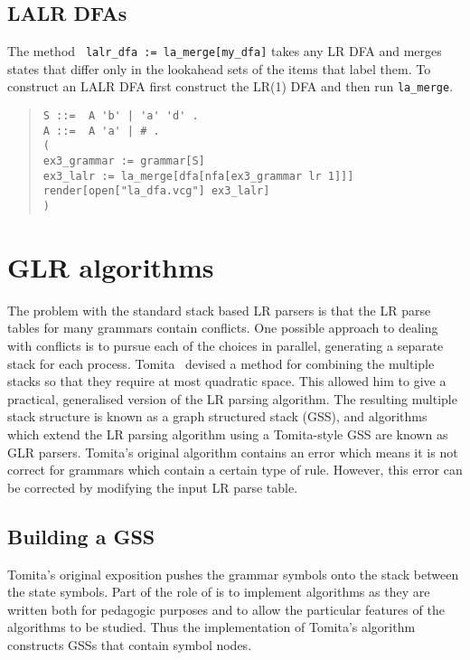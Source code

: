 \subsection{LALR DFAs}

The \gtb method
\verb+ lalr_dfa := la_merge[my_dfa]+
takes any LR DFA and merges states that differ only in the lookahead
sets of the items that label them. To construct an LALR DFA first
construct the LR(1) DFA and then run \verb+la_merge+.
\begin{quote}
\begin{verbatim}
S ::=  A 'b' | 'a' 'd' .
A ::=  A 'a' | # .
(
ex3_grammar := grammar[S]
ex3_lalr := la_merge[dfa[nfa[ex3_grammar lr 1]]]
render[open["la_dfa.vcg"] ex3_lalr]
)
\end{verbatim}
\end{quote}


\section{GLR algorithms}\label{GLR}

The problem with the standard stack based LR parsers
is that the LR parse tables for many grammars
contain conflicts. One possible 
approach to dealing with conflicts is to
pursue each of the choices in parallel, generating a separate stack
for each process. 
Tomita~\cite{TOMITA91} devised a method for combining the multiple
stacks so that they require at most quadratic space. This
allowed him to give a practical, generalised version of the LR parsing
algorithm.
The resulting multiple stack structure is known as a graph structured
stack (GSS), and algorithms which extend the LR parsing algorithm
using a Tomita-style GSS are known as GLR parsers.
Tomita's original algorithm contains an error which means it is not
correct for grammars which contain a certain type of rule. However,
this error can be corrected by modifying the input LR parse table.


\subsection{Building a GSS}


Tomita's original exposition pushes the grammar symbols onto
the stack between the state symbols. Part of the role of \gtb is to implement
algorithms as they are written both for pedagogic purposes and to
allow the particular features of the algorithms to be studied.
Thus the \gtb implementation of Tomita's algorithm constructs GSSs
that contain symbol nodes. 


